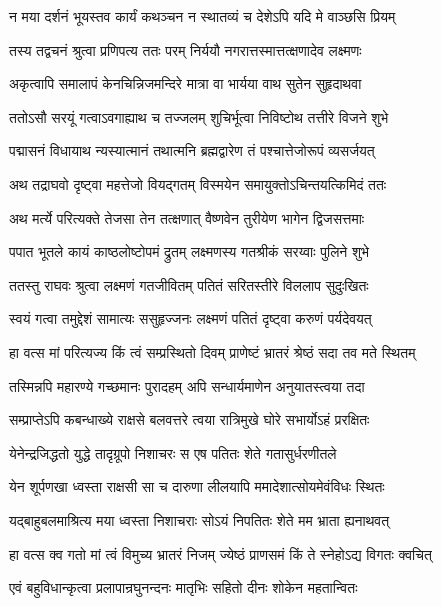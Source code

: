 \twolineshloka
{न मया दर्शनं भूयस्तव कार्यं कथञ्चन}
{न स्थातव्यं च देशेऽपि यदि मे वाञ्छसि प्रियम्}%

\twolineshloka
{तस्य तद्वचनं श्रुत्वा प्रणिपत्य ततः परम्}
{निर्ययौ नगरात्तस्मात्तत्क्षणादेव लक्ष्मणः}%

\twolineshloka
{अकृत्वापि समालापं केनचिन्निजमन्दिरे}
{मात्रा वा भार्यया वाथ सुतेन सुहृदाथवा}%

\twolineshloka
{ततोऽसौ सरयूं गत्वाऽवगाह्याथ च तज्जलम्}
{शुचिर्भूत्वा निविष्टोथ तत्तीरे विजने शुभे}%

\twolineshloka
{पद्मासनं विधायाथ न्यस्यात्मानं तथात्मनि}
{ब्रह्मद्वारेण तं पश्चात्तेजोरूपं व्यसर्जयत्}%

\twolineshloka
{अथ तद्राघवो दृष्ट्वा महत्तेजो वियद्गतम्}
{विस्मयेन समायुक्तोऽचिन्तयत्किमिदं ततः}%

\twolineshloka
{अथ मर्त्ये परित्यक्ते तेजसा तेन तत्क्षणात्}
{वैष्णवेन तुरीयेण भागेन द्विजसत्तमाः}%

\twolineshloka
{पपात भूतले कायं काष्ठलोष्टोपमं द्रुतम्}
{लक्ष्मणस्य गतश्रीकं सरय्वाः पुलिने शुभे}%

\twolineshloka
{ततस्तु राघवः श्रुत्वा लक्ष्मणं गतजीवितम्}
{पतितं सरितस्तीरे विललाप सुदुःखितः}%

\twolineshloka
{स्वयं गत्वा तमुद्देशं सामात्यः ससुहृज्जनः}
{लक्ष्मणं पतितं दृष्ट्वा करुणं पर्यदेवयत्}%

\twolineshloka
{हा वत्स मां परित्यज्य किं त्वं सम्प्रस्थितो दिवम्}
{प्राणेष्टं भ्रातरं श्रेष्ठं सदा तव मते स्थितम्}%

\twolineshloka
{तस्मिन्नपि महारण्ये गच्छमानः पुरादहम्}
{अपि सन्धार्यमाणेन अनुयातस्त्वया तदा}%

\twolineshloka
{सम्प्राप्तेऽपि कबन्धाख्ये राक्षसे बलवत्तरे}
{त्वया रात्रिमुखे घोरे सभार्योऽहं प्ररक्षितः}%

\twolineshloka
{येनेन्द्रजिद्धतो युद्धे तादृग्रूपो निशाचरः}
{स एष पतितः शेते गतासुर्धरणीतले}%

\twolineshloka
{येन शूर्पणखा ध्वस्ता राक्षसी सा च दारुणा}
{लीलयापि ममादेशात्सोयमेवंविधः स्थितः}%

\twolineshloka
{यद्बाहुबलमाश्रित्य मया ध्वस्ता निशाचराः}
{सोऽयं निपतितः शेते मम भ्राता ह्यनाथवत्}%

\twolineshloka
{हा वत्स क्व गतो मां त्वं विमुच्य भ्रातरं निजम्}
{ज्येष्ठं प्राणसमं किं ते स्नेहोऽद्य विगतः क्वचित्}%


\twolineshloka
{एवं बहुविधान्कृत्वा प्रलापान्रघुनन्दनः}
{मातृभिः सहितो दीनः शोकेन महतान्वितः}%

